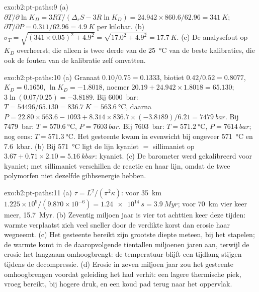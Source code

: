\begin{solution}{exo:b2:pt-paths:9}
(a) $\partial T/\partial\ln K_D = 3RT/(\Delta_r S - 3R\ln K_D) = 24.942\times860.6/62.96 =
\qty{341}{K}$; $\partial T/\partial P = 0.311/62.96 = \qty{4.9}{K}$ per kilobar.
(b) $\sigma_T = \sqrt{(341\times0.05)^2 + 4.9^2} = \sqrt{17.0^2 + 4.9^2} =
\qty{17.7}{K}$. (c) De analysefout op $K_D$ overheerst; die alleen is twee derde van
de \qty{25}{\celsius} van de beste kalibraties, die ook de fouten van de
kalibratie zelf omvatten.
\end{solution}

\begin{solution}{exo:b2:pt-paths:10}
(a) Granaat $0.10/0.75 = 0.1333$, biotiet $0.42/0.52 = 0.8077$, $K_D = 0.1650$, $\ln K_D =
-1.8018$, noemer $20.19 + 24.942\times1.8018 = 65.130$; $3\ln(0.07/0.25) = -3.8189$.
Bij \qty{6000}{bar}: $T = 54496/65.130 = \qty{836.7}{K} = \qty{563.6}{\celsius}$, daarna $P
= 22.80\times563.6 - 1093 + 8.314\times836.7\times(-3.8189)/6.21 = \qty{7479}{bar}$.
Bij \qty{7479}{bar}: $T = \qty{570.6}{\celsius}$, $P = \qty{7603}{bar}$. Bij
\qty{7603}{bar}: $T = \qty{571.2}{\celsius}$, $P = \qty{7614}{bar}$; nog eens: $T =
\qty{571.3}{\celsius}$. Het gesteente kwam in evenwicht bij ongeveer \qty{571}{\celsius} en
\qty{7.6}{kbar}. (b) Bij \qty{571}{\celsius} ligt de lijn kyaniet $=$ sillimaniet op $3.67
+ 0.71\times2.10 = \qty{5.16}{kbar}$: kyaniet. (c) De barometer werd gekalibreerd voor
kyaniet; met sillimaniet verschillen de reactie en haar lijn, omdat de twee polymorfen niet
dezelfde gibbsenergie hebben.
\end{solution}

\begin{solution}{exo:b2:pt-paths:11}
(a) $\tau = L^2/(\pi^2\kappa)$: voor \qty{35}{km} $1.225\times10^9/(9.870\times10^{-6}) =
\qty{1.24e14}{s} = \qty{3.9}{Myr}$; voor \qty{70}{km} vier keer meer,
\qty{15.7}{Myr}. (b) Zeventig miljoen jaar is vier tot achttien keer deze tijden: warmte
verplaatst zich veel sneller door de verdikte korst dan erosie haar wegneemt. (c) Het gesteente
bereikt zijn grootste diepte meteen, bij het stapelen; de warmte komt in de daaropvolgende
tientallen miljoenen jaren aan, terwijl de erosie het langzaam omhoogbrengt: de temperatuur blijft
een tijdlang stijgen tijdens de decompressie. (d) Erosie in zeven miljoen jaar zou
het gesteente omhoogbrengen voordat geleiding het had verhit: een lagere thermische piek, vroeg
bereikt, bij hogere druk, en een koud pad terug naar het oppervlak.
\end{solution}

